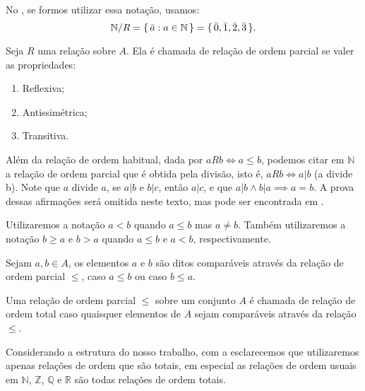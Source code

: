 \documentclass[../main.tex]{subfiles}
\begin{document}
\begin{ex}
    No , se formos utilizar essa notação, usamos:
    \[ \mathbb{N} / R = \{\, \Bar{a} : a \in \mathbb{N} \,\} = \{\, \Bar{0}, \Bar{1}, \Bar{2}, \Bar{3} \,\}.\]
\end{ex}

\begin{defi}\label{agb-def-relacaoOrdemParcial}
    Seja $R$ uma relação sobre $A$. Ela é chamada de relação de ordem parcial se valer as propriedades:
    \begin{enumerate}[label=(\roman*)]
        \item Reflexiva;
        \item Antissimétrica;
        \item Transitiva.
    \end{enumerate}
\end{defi}

Além da relação de ordem habitual, dada por $aRb \iff a \leq b$, podemos citar em $\mathbb{N}$ a relação de ordem parcial que é obtida pela divisão, isto é, $a R b \iff a | b$ (a divide b). Note que $a$ divide $a$, se $a | b$ e $b | c$, então $a | c$, e que $a | b \land b | a \implies a=b$. A prova dessas afirmações será omitida neste texto, mas pode ser encontrada em \textcite[p. 52]{domingues-2009}.

\begin{notacao}
    Utilizaremos a notação $a < b$ quando $a \leq b$ mas $a \neq b$. Também utilizaremos a notação $b \geq a$ e $b > a$ quando $a \leq b$ e $a < b$, respectivamente.
\end{notacao}

\begin{defi}
    Sejam $a,b \in A$, os elementos $a$ e $b$ são ditos comparáveis através da relação de ordem parcial $\leq$, caso $a \leq b$ ou caso $b \leq a$. 
\end{defi}

\begin{defi}\label{agb-def-relacaoOrdemTotal}
    Uma relação de ordem parcial $\leq$ sobre um conjunto $A$ é chamada de relação de ordem total caso quaisquer elementos de $A$ sejam comparáveis através da relação $\leq$.
\end{defi}

Considerando a estrutura do nosso trabalho, com a  esclarecemos que utilizaremos apenas relações de ordem que são totais, em especial as relações de ordem usuais em $\mathbb{N}$, $\mathbb{Z}$, $\mathbb{Q}$ e $\mathbb{R}$ são todas relações de ordem totais. 
\end{document}
